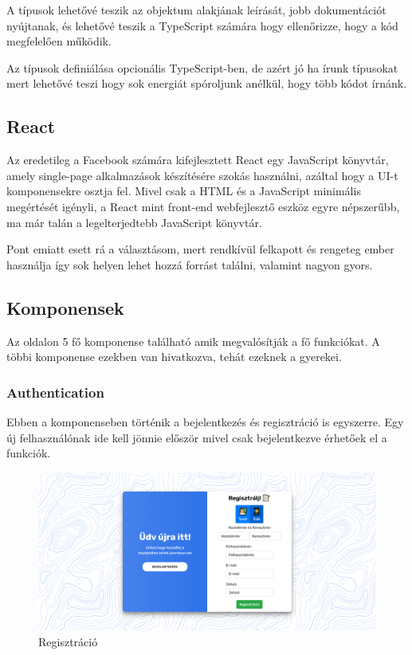 A típusok lehetővé teszik az objektum alakjának leírását, jobb dokumentációt nyújtanak, és lehetővé teszik a TypeScript számára hogy ellenőrizze, hogy a kód megfelelően működik.\bigskip

Az típusok definiálása opcionális TypeScript-ben, de azért jó ha írunk típusokat mert lehetővé teszi hogy sok energiát spóroljunk anélkül, hogy több kódot írnánk.

\subsection{React}

Az eredetileg a Facebook számára kifejlesztett React egy JavaScript könyvtár, amely single-page alkalmazások készítésére szokás használni, azáltal hogy a UI-t komponensekre osztja fel. Mivel csak a HTML és a JavaScript  minimális megértését igényli, a React mint front-end webfejlesztő eszköz egyre népszerűbb, ma már talán a legelterjedtebb JavaScript könyvtár. \bigskip

Pont emiatt esett rá a választásom, mert rendkívül felkapott és rengeteg ember használja így sok helyen lehet hozzá forrást találni, valamint nagyon gyors.

\subsection{Komponensek}

Az oldalon 5 fő komponense található amik megvalósítják a fő funkciókat. A többi komponense ezekben van hivatkozva, tehát ezeknek a gyerekei.

\subsubsection{Authentication}

Ebben a komponenseben történik a bejelentkezés és regisztráció is egyszerre. Egy új felhasználónak ide kell jönnie először mivel csak bejelentkezve érhetőek el a funkciók.


\begin{figure}[H]
    \centering
    \includegraphics[width=\linewidth]{images/signin.png}
    \caption{Regisztráció}
\end{figure}


